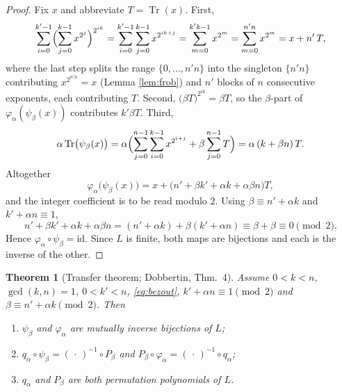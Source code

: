 \documentclass[11pt,a4paper]{article}
\newtheorem{theorem}{Theorem}[section]
\theoremstyle{definition}
\newcommand{\Tr}{\operatorname{Tr}}
\begin{document}
\begin{proof}
Fix $x$ and abbreviate $T=\Tr(x)$.  First,
\[
  \sum_{i=0}^{k'-1}\Bigl(\sum_{j=0}^{k-1}x^{2^{j}}\Bigr)^{2^{ik}}
  =\sum_{i=0}^{k'-1}\sum_{j=0}^{k-1}x^{2^{ik+j}}
  =\sum_{m=0}^{k'k-1}x^{2^{m}}
  =\sum_{m=0}^{n'n}x^{2^{m}}
  =x+n'\,T ,
\]
where the last step splits the range $\{0,\dots,n'n\}$ into the singleton
$\{n'n\}$ contributing $x^{2^{n'n}}=x$ (Lemma \ref{lem:frob}) and $n'$ blocks of
$n$ consecutive exponents, each contributing $T$.  Second,
$\bigl(\beta T\bigr)^{2^{ik}}=\beta T$, so the $\beta$-part of
$\varphi_\alpha(\psi_\beta(x))$ contributes $k'\beta T$.  Third,
\[
  \alpha\Tr\bigl(\psi_\beta(x)\bigr)
  =\alpha\Bigl(\sum_{j=0}^{n-1}\sum_{i=0}^{k-1}x^{2^{i+j}}+\beta\sum_{j=0}^{n-1}T\Bigr)
  =\alpha\,(k+\beta n)\,T .
\]
Altogether
\[
  \varphi_\alpha\bigl(\psi_\beta(x)\bigr)=x+\bigl(n'+\beta k'+\alpha k+\alpha\beta n\bigr)T ,
\]
and the integer coefficient is to be read modulo $2$.  Using
$\beta\equiv n'+\alpha k$ and $k'+\alpha n\equiv1$,
\[
  n'+\beta k'+\alpha k+\alpha\beta n=(n'+\alpha k)+\beta(k'+\alpha n)
  \equiv\beta+\beta\equiv0 \pmod 2 .
\]
Hence $\varphi_\alpha\circ\psi_\beta=\mathrm{id}$.  Since $L$ is finite, both maps
are bijections and each is the inverse of the other.
\end{proof}

\begin{theorem}[Transfer theorem; Dobbertin, Thm.~4]\label{thm:transfer}
Assume $0<k<n$, $\gcd(k,n)=1$, $0<k'<n$, \eqref{eq:bezout},
$k'+\alpha n\equiv1\pmod2$ and $\beta\equiv n'+\alpha k\pmod2$.  Then
\begin{enumerate}
\item $\psi_\beta$ and $\varphi_\alpha$ are mutually inverse bijections of $L$;
\item $q_\alpha\circ\psi_\beta=(\,\cdot\,)^{-1}\circ P_\beta$ and
      $P_\beta\circ\varphi_\alpha=(\,\cdot\,)^{-1}\circ q_\alpha$;
\item $q_\alpha$ and $P_\beta$ are both permutation polynomials of $L$.
\end{enumerate}
\end{theorem}
\end{document}
